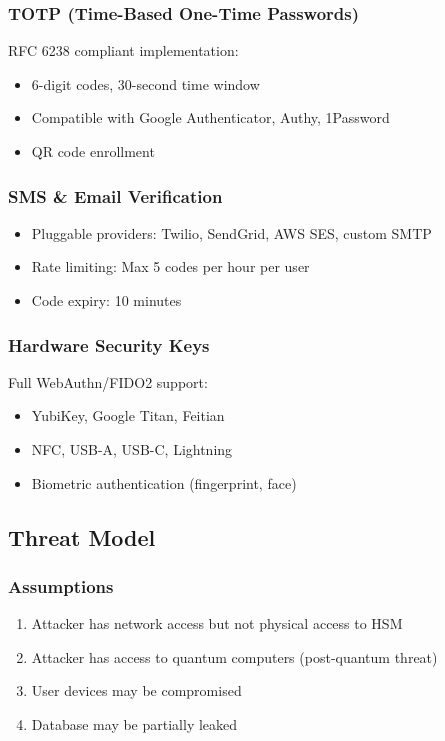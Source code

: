 \documentclass[11pt,a4paper]{article}
\begin{document}
\subsubsection{TOTP (Time-Based One-Time Passwords)}

RFC 6238 \cite{rfc6238} compliant implementation:
\begin{itemize}
  \item 6-digit codes, 30-second time window
  \item Compatible with Google Authenticator, Authy, 1Password
  \item QR code enrollment
\end{itemize}

\subsubsection{SMS \& Email Verification}

\begin{itemize}
  \item Pluggable providers: Twilio, SendGrid, AWS SES, custom SMTP
  \item Rate limiting: Max 5 codes per hour per user
  \item Code expiry: 10 minutes
\end{itemize}

\subsubsection{Hardware Security Keys}

Full WebAuthn/FIDO2 support:
\begin{itemize}
  \item YubiKey, Google Titan, Feitian
  \item NFC, USB-A, USB-C, Lightning
  \item Biometric authentication (fingerprint, face)
\end{itemize}

\subsection{Threat Model}

\subsubsection{Assumptions}

\begin{enumerate}
  \item Attacker has network access but not physical access to HSM
  \item Attacker has access to quantum computers (post-quantum threat)
  \item User devices may be compromised
  \item Database may be partially leaked
\end{enumerate}
\end{document}
